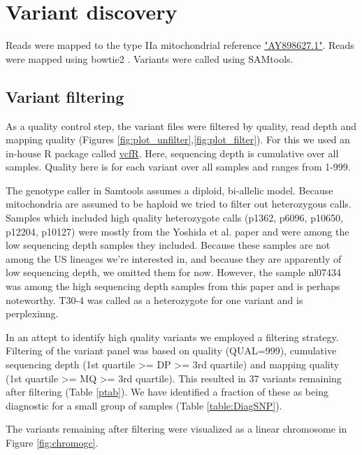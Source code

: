 \documentclass{article}\usepackage[]{graphicx}\usepackage[]{color}
\begin{document}

\section{Variant discovery}

Reads were mapped to the type IIa mitochondrial reference \href{http://www.ncbi.nlm.nih.gov/nuccore/AY898627.1}{"AY898627.1"}.  Reads were mapped using bowtie2 \cite{langmead2012fast}.  Variants were called using SAMtools\cite{li2009sequence}.

\subsection{Variant filtering}
As a quality control step, the variant files were filtered by quality, read depth and mapping quality (Figures \ref{fig:plot_unfilter},\ref{fig:plot_filter}). For this we used an in-house R package called \href{https://github.com/knausb/vcfR}{vcfR}. Here, sequencing depth is cumulative over all samples.  Quality here is for each variant over all samples and ranges from 1-999.

The genotype caller in Samtools assumes a diploid, bi-allelic model.  Because mitochondria are assumed to be haploid we tried to filter out heterozygous calls.  Samples which included high quality heterozygote calls (p1362, p6096, p10650, p12204, p10127) were mostly from the Yoshida et al. \cite{yoshida2013correction} paper and were among the low sequencing depth samples they included.  Because these samples are not among the US lineages we're interested in, and because they are apparently of low sequencing depth, we omitted them for now.  However, the sample nl07434 was among the high sequencing depth samples from this paper and is perhaps noteworthy.  T30-4 was called as a heterozygote for one variant and is perplexinng.

In an attept to identify high quality variants we employed a filtering strategy.  Filtering of the variant panel was based on quality (QUAL=999), cumulative sequencing depth (1st quartile >= DP >= 3rd quartile) and mapping quality (1st quartile >= MQ >= 3rd quartile).  This resulted in 37 variants remaining after filtering (Table \ref{ptab}).  We have identified a fraction of these as being diagnostic for a small group of samples (Table \ref{table:DiagSNP}).

The variants remaining after filtering were visualized as a linear chromosome in Figure \ref{fig:chromogc}.
\end{document}
